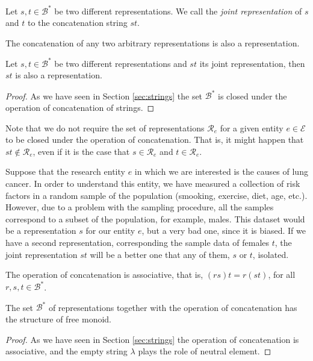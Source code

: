 \begin{definition}
Let $s, t \in \mathcal{B}^\ast$ be two different representations. We call the \emph{joint representation} of $s$ and $t$ to the concatenation string $st$.
\end{definition}

The concatenation of any two arbitrary representations is also a representation.

\begin{proposition}
Let $s, t \in \mathcal{B}^\ast$ be two different representations and $st$ its joint representation, then $st$ is also a representation.
\end{proposition}
\begin{proof}
As we have seen in Section \ref{sec:strings} the set $\mathcal{B}^\ast$ is closed under the operation of concatenation of strings.
\end{proof}

Note that we do not require the set of representations $\mathcal{R}_e$ for a given entity $e \in \mathcal{E}$ to be closed under the operation of concatenation. That is, it might happen that $st \notin \mathcal{R}_e$, even if it is the case that $s \in \mathcal{R}_e$ and $t \in \mathcal{R}_e$.

\begin{example}
\label{ex:lung_cancer}
Suppose that the research entity $e$ in which we are interested is the causes of lung cancer. In order to understand this entity, we have measured a collection of risk factors in a random sample of the population (smooking, exercise, diet, age, etc.). However, due to a problem with the sampling procedure, all the samples correspond to a subset of the population, for example, males. This dataset would be a representation $s$ for our entity $e$, but a very bad one, since it is biased. If we have a second representation, corresponding the sample data of females $t$, the joint representation $st$ will be a better one that any of them, $s$ or $t$, isolated.
\end{example}

The operation of concatenation is associative, that is, $(rs)t = r(st)$, for all $r, s, t \in \mathcal{B}^\ast$.

\begin{proposition}
The set $\mathcal{B}^\ast$ of representations together with the operation of concatenation has the structure of free monoid.
\end{proposition}
\begin{proof}
As we have seen in Section \ref{sec:strings} the operation of concatenation is associative, and the empty string $\lambda$ plays the role of neutral element.
\end{proof}


